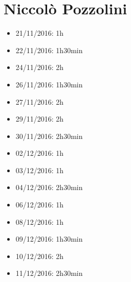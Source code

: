 \section{Niccolò Pozzolini}
\begin{itemize}
	\item 21/11/2016: 1h
	\item 22/11/2016: 1h30min
	\item 24/11/2016: 2h
	\item 26/11/2016: 1h30min
	\item 27/11/2016: 2h
	\item 29/11/2016: 2h
	\item 30/11/2016: 2h30min
	\item 02/12/2016: 1h
	\item 03/12/2016: 1h
	\item 04/12/2016: 2h30min
	\item 06/12/2016: 1h
	\item 08/12/2016: 1h
	\item 09/12/2016: 1h30min
	\item 10/12/2016: 2h
	\item 11/12/2016: 2h30min
\end{itemize}